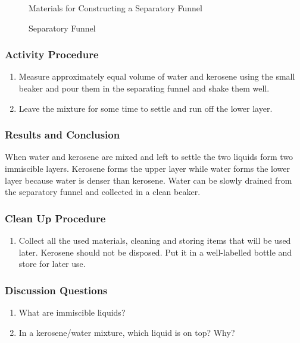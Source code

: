 \begin{figure}[h]
\begin{center}
\def\svgwidth{250pt}

\caption{Materials for Constructing a Separatory Funnel}
\label{fig:separating-funnel_materials}
\end{center}
\end{figure}

\begin{figure}[h]
\begin{center}
\def\svgwidth{50pt}

\caption{Separatory Funnel}
\label{fig:sep-funnel}
\end{center}
\end{figure}

\subsubsection*{Activity Procedure}
\begin{enumerate}
\item{Measure approximately equal volume of water and kerosene using the small beaker and pour them in the separating funnel and shake them well.}
\item{Leave the mixture for some time to settle and run off the lower layer.}
\end{enumerate}

\subsubsection*{Results and Conclusion}
When water and kerosene are mixed and left to settle the two liquids form two immiscible layers. Kerosene forms the upper layer while water forms the lower layer because water is denser than kerosene. Water can be slowly drained from the separatory funnel and collected in a clean beaker.

\subsubsection*{Clean Up Procedure}
\begin{enumerate}
\item{Collect all the used materials, cleaning and storing items that will be used later. Kerosene should not be disposed. Put it in a well-labelled bottle and store for later use.}
\end{enumerate}

\subsubsection*{Discussion Questions}
\begin{enumerate}
\item{What are immiscible liquids?}
\item{In a kerosene/water mixture, which liquid is on top? Why?}
\end{enumerate}


